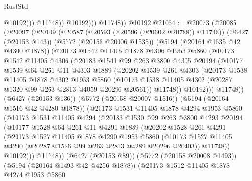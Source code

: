 \begin{lexlean}{RustStd}
\begin{coremodule}
                        @10192)))
                  @11748))
              @10192)))
        @11748))
    @10192
@21064 := @20073
    (@20085
      (@20097
        (@20109
          (@20587 (@20593 (@20596 (@20602 @20788)) @11748))
          (@6427 (@20153 @143))
          (@5772 (@20158 @20006 @1535))
          (@5194 (@20164 @1535 @42 @4300 @1878))
          (@20173
            @1542
            @11405
            @1878
            @4306
            @1953
            @5860
            (@10173
              @1542
              @11405
              @4306
              (@20183
                @1541
                @99
                @263
                @3800
                @4305
                @20194
                (@10177
                  @1539
                  @64
                  @261
                  @11
                  @4303
                  @1889
                  (@20202
                    @1539
                    @261
                    @4303
                    (@20173
                      @1538
                      @11405
                      @1878
                      @4302
                      @1953
                      @5860
                      (@10173 @1538 @11405 @4302 (@20287 @1320 @99 @263 @2813 @4059 @20296 @20561))
                      @11748))
                  @10192)))
            @11748))
        (@6427 (@20153 @136))
        (@5772 (@20158 @20007 @1516))
        (@5194 (@20164 @1516 @42 @4280 @1878))
        (@20173
          @1531
          @11405
          @1878
          @4294
          @1953
          @5860
          (@10173
            @1531
            @11405
            @4294
            (@20183
              @1530
              @99
              @263
              @3800
              @4293
              @20194
              (@10177
                @1528
                @64
                @261
                @11
                @4291
                @1889
                (@20202
                  @1528
                  @261
                  @4291
                  (@20173
                    @1527
                    @11405
                    @1878
                    @4290
                    @1953
                    @5860
                    (@10173 @1527 @11405 @4290 (@20287 @1526 @99 @263 @2813 @4289 @20296 @20403))
                    @11748))
                @10192)))
          @11748))
      (@6427 (@20153 @89))
      (@5772 (@20158 @20008 @1493))
      (@5194 (@20164 @1493 @42 @4256 @1878))
      (@20173
        @1512
        @11405
        @1878
        @4274
        @1953
        @5860

\end{coremodule}
\end{lexlean}
